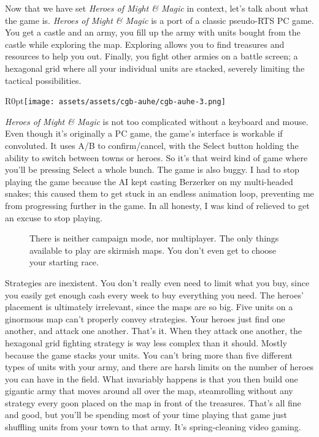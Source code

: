 \documentclass{book}
\begin{document}
Now that we have set \emph{Heroes of Might \& Magic} in context, let’s talk about what the game is. \emph{Heroes of Might \& Magic} is a port of a classic pseudo-RTS PC game. You get a castle and an army, you fill up the army with units bought from the castle while exploring the map. Exploring allows you to find treasures and resources to help you out. Finally, you fight other armies on a battle screen; a hexagonal grid where all your individual units are stacked, severely limiting the tactical possibilities.\par
\begin{wrapfigure}{R}{0pt}{\texttt{[image: assets/assets/cgb-auhe/cgb-auhe-3.png]}}\end{wrapfigure}
\emph{Heroes of Might \& Magic} is not too complicated without a keyboard and mouse. Even though it’s originally a PC game, the game’s interface is workable if convoluted. It uses A/B to confirm/cancel, with the Select button holding the ability to switch between towns or heroes. So it’s that weird kind of game where you’ll be pressing Select a whole bunch. The game is also buggy. I had to stop playing the game because the AI kept casting Berzerker on my multi-headed snakes; this caused them to get stuck in an endless animation loop, preventing me from progressing further in the game. In all honesty, I was kind of relieved to get an excuse to stop playing.\par
\FloatBarrier\vspace{\baselineskip}\begin{figure}[H]\caption*{There is neither campaign mode, nor multiplayer. The only things available to play are skirmish maps. You don’t even get to choose your starting race.}\end{figure}
Strategies are inexistent. You don’t really even need to limit what you buy, since you easily get enough cash every week to buy everything you need. The heroes’ placement is ultimately irrelevant, since the maps are so big. Five units on a ginormous map can’t properly convey strategies. Your heroes just find one another, and attack one another. That’s it. When they attack one another, the hexagonal grid fighting strategy is way less complex than it should. Mostly because the game stacks your units. You can’t bring more than five different types of units with your army, and there are harsh limits on the number of heroes you can have in the field. What invariably happens is that you then build one gigantic army that moves around all over the map, steamrolling without any strategy every goon placed on the map in front of the treasures. That’s all fine and good, but you’ll be spending most of your time playing that game just shuffling units from your town to that army. It’s spring-cleaning video gaming.\par
\end{document}
